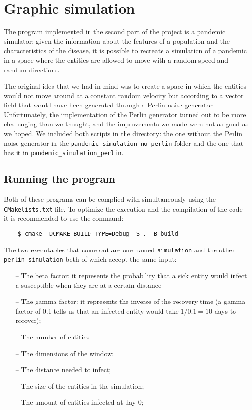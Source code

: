 \section{Graphic simulation}

The program implemented in the second part of the project is a pandemic simulator: given the information about the features of a population and the characteristics of the disease, it is possible to recreate a simulation of a pandemic in a space where the entities are allowed to move with a random speed and random directions.

  The original idea that we had in mind was to create a space in which the entities would not move around at a constant random velocity but according to a vector field that would have been generated through a Perlin noise generator. Unfortunately, the implementation of the Perlin generator turned out to be more challenging than we thought, and the improvements we made were not as good as we hoped. We included both scripts in the directory: the one without the Perlin noise generator in the \verb|pandemic_simulation_no_perlin| folder and the one that has it in \verb|pandemic_simulation_perlin|.

\subsection{Running the program}

  Both of these programs can be complied with simultaneously using the \verb|CMakelists.txt| file. To optimize the execution and the compilation of the code it is recommended to use the command:
  \begin{verbatim}
    $ cmake -DCMAKE_BUILD_TYPE=Debug -S . -B build
  \end{verbatim}

  The two executables that come out are one named \verb|simulation| and the other \verb|perlin_simulation| both of which accept the same input:
  \begin{itemize}
    \item[--]The beta factor: it represents the probability that a sick entity would infect a susceptible when they are at a certain distance;
    \item[--] The gamma factor: it represents the inverse of the recovery time (a gamma factor of 0.1 tells us that an infected entity would take $ 1/0.1 = 10$ days to recover);
    \item[--] The number of entities;
    \item[--] The dimensions of the window;
    \item[--] The distance needed to infect;
    \item[--] The size of the entities in the simulation;
    \item [--] The amount of entities infected at day 0;
  \end{itemize}

